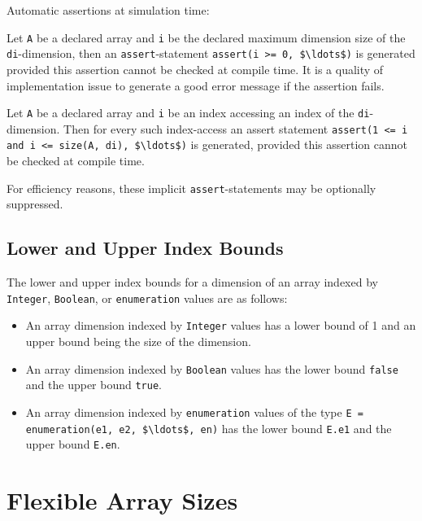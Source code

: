 \begin{nonnormative}
Automatic assertions at simulation time:

Let \lstinline!A! be a declared array and \lstinline!i! be the declared maximum dimension size of the \lstinline!di!-dimension, then an \lstinline!assert!-statement \lstinline!assert(i >= 0, $\ldots$)! is generated provided this assertion cannot be checked at compile time.  It is a quality of implementation issue to generate a good error message if the assertion fails.

Let \lstinline!A! be a declared array and \lstinline!i! be an index accessing an index of the \lstinline!di!-dimension.  Then for every such index-access an assert
statement \lstinline!assert(1 <= i and i <= size(A, di), $\ldots$)! is generated, provided this assertion cannot be checked at compile time.

For efficiency reasons, these implicit \lstinline!assert!-statements may be optionally suppressed.
\end{nonnormative}

\subsection{Lower and Upper Index Bounds}\label{array-dimension-lower-and-upper-index-bounds}\label{lower-and-upper-index-bounds}

The lower and upper index bounds for a dimension of an array indexed by \lstinline!Integer!, \lstinline!Boolean!, or \lstinline!enumeration! values are as follows:
\begin{itemize}
\item
  An array dimension indexed by \lstinline!Integer! values has a lower bound of 1 and an upper bound being the size of the dimension.
\item
  An array dimension indexed by \lstinline!Boolean! values has the lower bound \lstinline!false! and the upper bound \lstinline!true!.
\item
  An array dimension indexed by \lstinline!enumeration! values of the type \lstinline!E = enumeration(e1, e2, $\ldots$, en)!
  has the lower bound \lstinline!E.e1! and the upper bound \lstinline!E.en!.
\end{itemize}

\section{Flexible Array Sizes}\label{flexible-array-sizes}

